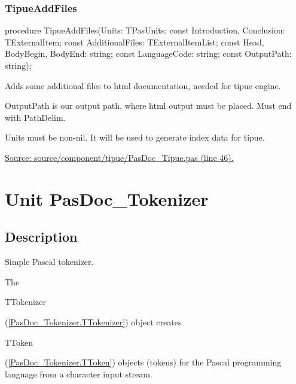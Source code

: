 \documentclass{report}
\newif\ifpdf
\begin{document}
\subsection*{TipueAddFiles}
\fi
\label{PasDoc_Tipue-TipueAddFiles}
\begin{list}{}{
\setlength{\itemindent}{0cm}
\setlength{\listparindent}{0cm}
\setlength{\leftmargin}{\evensidemargin}
\addtolength{\leftmargin}{\tmplength}
\settowidth{\labelsep}{X}
\addtolength{\leftmargin}{\labelsep}
\setlength{\labelwidth}{\tmplength}
}
\item[\textbf{Declaration}\hfill]
\ifpdf
\begin{flushleft}
\fi
\begin{ttfamily}
procedure TipueAddFiles(Units: TPasUnits; const Introduction, Conclusion: TExternalItem; const AdditionalFiles: TExternalItemList; const Head, BodyBegin, BodyEnd: string; const LanguageCode: string; const OutputPath: string);\end{ttfamily}

\ifpdf
\end{flushleft}
\fi

\par
\item[\textbf{Description}]
Adds some additional files to html documentation, needed for tipue engine.

OutputPath is our output path, where html output must be placed. Must end with PathDelim.

Units must be non{-}nil. It will be used to generate index data for tipue.\par
\href{https://github.com/pasdoc/pasdoc/blob/master/source/component/tipue/PasDoc_Tipue.pas#L46}{Source: source/component/tipue/PasDoc{\_}Tipue.pas (line 46).}

\end{list}
\chapter{Unit PasDoc{\_}Tokenizer}
\label{PasDoc_Tokenizer}
\section{Description}
Simple Pascal tokenizer.\hfill\vspace*{1ex}

     

The \begin{ttfamily}TTokenizer\end{ttfamily}(\ref{PasDoc_Tokenizer.TTokenizer}) object creates \begin{ttfamily}TToken\end{ttfamily}(\ref{PasDoc_Tokenizer.TToken}) objects (tokens) for the Pascal programming language from a character input stream.
\end{document}
